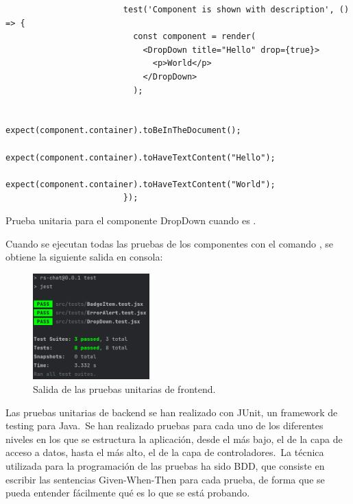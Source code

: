 \begin{codeBlock}
	\begin{verbatim}
						test('Component is shown with description', () => {
						  const component = render(
						    <DropDown title="Hello" drop={true}>
						      <p>World</p>
						    </DropDown>
						  );

						  expect(component.container).toBeInTheDocument();
						  expect(component.container).toHaveTextContent("Hello");
						  expect(component.container).toHaveTextContent("World");
						});
	\end{verbatim}
	\caption{Prueba unitaria para el componente DropDown cuando  es .}
	\label{code:prueba-unitaria-dropdown-true}
\end{codeBlock}

Cuando se ejecutan todas las pruebas de los componentes con el comando , se
obtiene la siguiente salida en consola:

\begin{figure}[H]
	\centering
	\includegraphics[width=0.4\textwidth]{res/images/pruebas-unitarias-frontend}
	\caption{Salida de las pruebas unitarias de frontend.}
	\label{fig:pruebas-unitarias-frontend}
\end{figure}


Las pruebas unitarias de backend se han realizado con JUnit, un framework de testing para Java.\ Se han
realizado pruebas para cada uno de los diferentes niveles en los que se estructura la aplicación, desde el más
bajo, el de la capa de acceso a datos, hasta el más alto, el de la capa de controladores.\ La técnica utilizada
para la programación de las pruebas ha sido BDD, que consiste en escribir las
sentencias Given-When-Then para cada prueba, de forma que se pueda entender fácilmente qué es lo que se está
probando.

